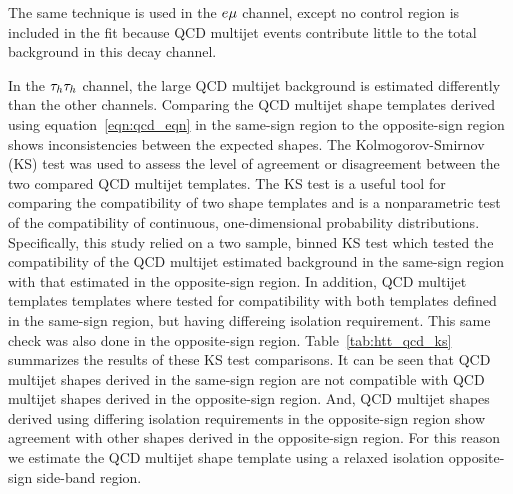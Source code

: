 The same technique is used in the $e\mu$ channel, except no control region is included in the 
fit because QCD multijet events contribute little to the total background in this decay channel.


In the $\tau_{h}\tau_{h}$ channel, the large QCD multijet background is estimated differently than
the other channels. Comparing the QCD multijet shape templates derived using equation~\ref{eqn:qcd_eqn} 
in the same-sign region to the opposite-sign region shows inconsistencies between the expected shapes.
The Kolmogorov-Smirnov (KS) test was used to assess the level of agreement or disagreement
between the two compared QCD multijet templates. The KS test is a useful tool for comparing
the compatibility of two shape templates and is a nonparametric test of the compatibility
of continuous, one-dimensional probability distributions. Specifically, this study relied
on a two sample, binned KS test which tested the compatibility of the QCD multijet
estimated background in the same-sign region with that estimated in the opposite-sign region.
In addition, QCD multijet templates templates where tested for compatibility with both templates
defined in the same-sign region, but having differeing isolation requirement. This same check
was also done in the opposite-sign region. Table~\ref{tab:htt_qcd_ks} summarizes the results of
these KS test comparisons. It can be seen that QCD multijet shapes derived in the same-sign region
are not compatible with QCD multijet shapes derived in the opposite-sign region. And, QCD multijet
shapes derived using differing isolation requirements in the opposite-sign region show agreement
with other shapes derived in the opposite-sign region. For this reason we estimate the QCD multijet
shape template using a relaxed isolation opposite-sign side-band region.

